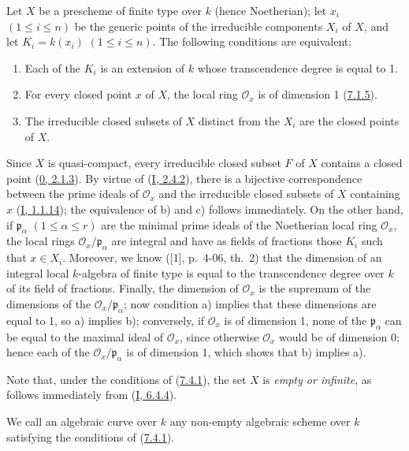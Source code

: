 \begin{proposition}[7.4.1]
\label{II.7.4.1}
Let $X$ be a prescheme of finite type over $k$ (hence Noetherian); let $x_i$
$(1\leq i\leq n)$ be the generic points of the irreducible components $X_i$ of
$X$, and let $K_i=k(x_i)$ $(1\leq i\leq n)$. The following conditions are
equivalent:
\begin{enumerate}
\item[\rm a)] Each of the $K_i$ is an extension of $k$ whose transcendence
degree is equal to 1.
\item[\rm b)] For every closed point $x$ of $X$, the local ring
$\mathcal{O}_x$ is of dimension 1 (\hyperref[II.7.1.5]{7.1.5}).
\item[\rm c)] The irreducible closed subsets of $X$ distinct from the $X_i$
are the closed points of $X$.
\end{enumerate}
\end{proposition}

Since $X$ is quasi-compact, every irreducible closed subset $F$ of $X$
contains a closed point (\hyperref[0.2.1.3]{0, 2.1.3}). By virtue of
(\hyperref[I.2.4.2]{I, 2.4.2}), there is a bijective correspondence between the
prime ideals of $\mathcal{O}_x$ and the irreducible closed subsets of $X$
containing $x$ (\hyperref[I.1.1.14]{I, 1.1.14}); the equivalence of b) and c)
follows immediately. On the other hand, if $\mathfrak{p}_\alpha$
$(1\leq\alpha\leq r)$ are the minimal prime ideals of the Noetherian local
ring $\mathcal{O}_x$, the local rings
$\mathcal{O}_x/\mathfrak{p}_\alpha$ are integral and have as fields of
fractions those $K_i$ such that $x\in X_i$. Moreover, we know ([1],
p.~4-06, th.~2) that the dimension of an integral local $k$-algebra of finite
type is equal to the transcendence degree over $k$ of its field of fractions.
Finally, the dimension of $\mathcal{O}_x$ is the supremum of the dimensions of the
$\mathcal{O}_x/\mathfrak{p}_\alpha$; now condition a) implies that these
dimensions are equal to 1, so a) implies b); conversely, if
$\mathcal{O}_x$ is of dimension 1, none of the $\mathfrak{p}_\alpha$ can
be equal to the maximal ideal of $\mathcal{O}_x$, since otherwise $\mathcal{O}_x$
would be of dimension 0; hence each of the
$\mathcal{O}_x/\mathfrak{p}_\alpha$ is of dimension 1, which shows that b)
implies a).

Note that, under the conditions of (\hyperref[II.7.4.1]{7.4.1}),
the set $X$ is \emph{empty or infinite}, as follows immediately from
(\hyperref[I.6.4.4]{I, 6.4.4}).

\begin{definition}[7.4.2]
\label{II.7.4.2}
We call an algebraic curve over $k$ any non-empty algebraic scheme over $k$
satisfying the conditions of (\hyperref[II.7.4.1]{7.4.1}).
\end{definition}


